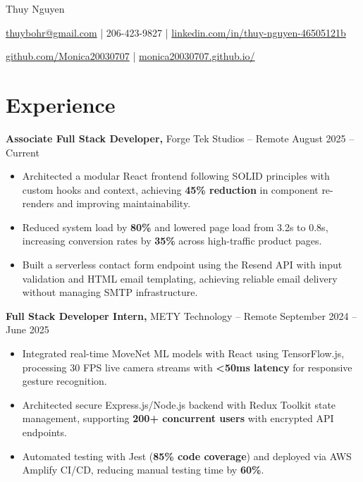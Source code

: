 \documentclass[11pt]{article}
\begin{document}
\centerline{\Huge Thuy Nguyen}

\vspace{5pt}

\centerline{\href{mailto:thuybohr@gmail.com}{thuybohr@gmail.com} | 206-423-9827 |
\href{https://www.linkedin.com/in/thuy-nguyen-46505121b/}{linkedin.com/in/thuy-nguyen-46505121b}}

\centerline{\href{https://github.com/Monica20030707}{github.com/Monica20030707} |
\href{https://monica20030707.github.io/}{monica20030707.github.io/}}

\vspace{-9pt}

\section*{Experience}

\textbf{Associate Full Stack Developer,} {Forge Tek Studios} -- Remote \hfill August 2025 -- Current
\vspace{-9pt}
\begin{itemize}
  \item Architected a modular React frontend following SOLID principles with custom hooks and context, achieving \textbf{45\% reduction} in component re-renders and improving maintainability.
  \item Reduced system load by \textbf{80\%} and lowered page load from 3.2s to 0.8s, increasing conversion rates by \textbf{35\%} across high-traffic product pages.
  \item Built a serverless contact form endpoint using the Resend API with input validation and HTML email templating, achieving reliable email delivery without managing SMTP infrastructure.
\end{itemize}

\textbf{Full Stack Developer Intern,} {METY Technology} -- Remote \hfill September 2024 -- June 2025
\vspace{-9pt}
\begin{itemize}
  \item Integrated real-time MoveNet ML models with React using TensorFlow.js, processing 30 FPS live camera streams with \textbf{<50ms latency} for responsive gesture recognition.
  \item Architected secure Express.js/Node.js backend with Redux Toolkit state management, supporting \textbf{200+ concurrent users} with encrypted API endpoints.
  \item Automated testing with Jest (\textbf{85\% code coverage}) and deployed via AWS Amplify CI/CD, reducing manual testing time by \textbf{60\%}.
\end{itemize}
\end{document}
